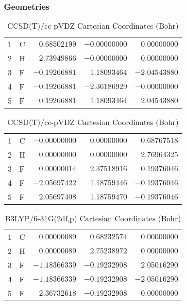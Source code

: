 \documentclass[10pt,oneside]{article}
\begin{document}
\begin{table}[h!]
\subsubsection*{Geometries}
\begin{multicols}{2}
\centering
\caption{CCSD(T)/cc-pVTZ Cartesian Coordinates (Bohr)}
\begin{tabular}{llrrr}
\toprule
1  & C  & $ 0.68502199$ & $-0.00000000$ & $ 0.00000000$ \\
2  & H  & $ 2.73949866$ & $-0.00000000$ & $ 0.00000000$ \\
3  & F  & $-0.19266881$ & $ 1.18093464$ & $-2.04543880$ \\
4  & F  & $-0.19266881$ & $-2.36186929$ & $-0.00000000$ \\
5  & F  & $-0.19266881$ & $ 1.18093464$ & $ 2.04543880$ \\
\bottomrule
\end{tabular}
\caption{CCSD(T)/cc-pVDZ Cartesian Coordinates (Bohr)}
\begin{tabular}{llrrr}
\toprule
1  & C  & $-0.00000000$ & $ 0.00000000$ & $ 0.68767518$ \\
2  & H  & $-0.00000000$ & $ 0.00000000$ & $ 2.76964325$ \\
3  & F  & $ 0.00000014$ & $-2.37518916$ & $-0.19376046$ \\
4  & F  & $-2.05697422$ & $ 1.18759446$ & $-0.19376046$ \\
5  & F  & $ 2.05697408$ & $ 1.18759470$ & $-0.19376046$ \\
\bottomrule
\end{tabular}
\end{multicols}
\end{table}

\begin{table}[h]
\centering
\caption{B3LYP/6-31G(2df,p) Cartesian Coordinates (Bohr)}
\begin{tabular}{llrrr}
\toprule
1  & C  & $ 0.00000089$ & $ 0.68232574$ & $ 0.00000000$ \\
2  & H  & $ 0.00000089$ & $ 2.75238972$ & $ 0.00000000$ \\
3  & F  & $-1.18366339$ & $-0.19232908$ & $ 2.05016290$ \\
4  & F  & $-1.18366339$ & $-0.19232908$ & $-2.05016290$ \\
5  & F  & $ 2.36732618$ & $-0.19232908$ & $ 0.00000000$ \\
\bottomrule
\end{tabular}
\end{table}
\end{document}
